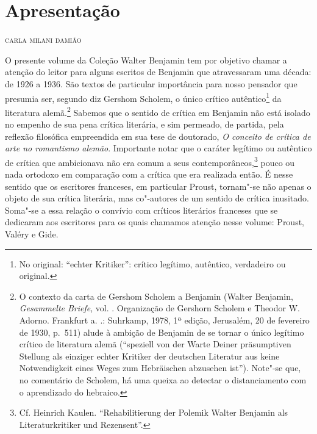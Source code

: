 \chapter*{Apresentação}

\begin{flushright}
{\bigskip\small\scshape\hfill {carla milani damião}}\smallskip
\end{flushright}

\noindent{}O presente volume da Coleção Walter Benjamin tem por objetivo chamar a
atenção do leitor para alguns escritos de Benjamin que atravessaram uma década: de 1926
a 1936. São textos de particular importância para nosso pensador que
presumia ser, segundo diz Gershom Scholem, o único crítico autêntico\footnote{No original: ``echter Kritiker'': crítico legítimo, autêntico, verdadeiro ou original.} da
literatura alemã.\footnote{O contexto da carta de Gershom Scholem a
  Benjamin (Walter Benjamin, \emph{Gesammelte Briefe}, vol. . Organização de Gershorn
  Scholem e Theodor W. Adorno. Frankfurt a. .: Suhrkamp, 1978, 1ª edição, Jerusalém, 20 de fevereiro de 1930, p.~511) alude à ambição de
  Benjamin de se tornar o único legítimo crítico de literatura alemã
  (``speziell von der Warte Deiner präsumptiven Stellung als einziger
      echter Kritiker der deutschen Literatur aus keine Notwendigkeit eines
      Weges zum Hebräischen abzusehen ist''). Note"-se que, no comentário de
  Scholem, há uma queixa ao detectar o distanciamento com o aprendizado
  do hebraico.} Sabemos que o sentido de crítica em Benjamin não está
isolado no empenho de sua pena crítica literária, e sim permeado, de
partida, pela reflexão filosófica empreendida em sua tese de doutorado,
\emph{O conceito de crítica de arte no romantismo alemão}. Importante
notar que o caráter legítimo ou autêntico de crítica que ambicionava não era comum a
seus contemporâneos,\footnote{Cf. Heinrich Kaulen. ``Rehabilitierung der
  Polemik Walter Benjamin als Literaturkritiker und Rezensent''.} pouco ou nada ortodoxo em comparação com a crítica que
era realizada então. É nesse sentido que os escritores franceses, em particular Proust, tornam"-se não apenas o objeto de sua crítica literária, mas co"-autores de um sentido de crítica inusitado. Soma"-se a essa relação o convívio com críticos literários franceses que se dedicaram aos escritores para os quais chamamos atenção nesse volume: Proust, Valéry e Gide.

